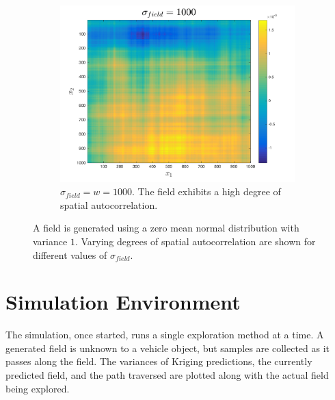 \begin{figure}[ht!]
\begin{subfigure}[t]{0.33333\textwidth}
    \end{subfigure}%
    ~ 
    \begin{subfigure}[t]{0.33333\textwidth}
        \centering
        \includegraphics[width=\linewidth]{figures/autocorr_sigma_1000.png}
		\captionsetup{skip=0.25\baselineskip,size=footnotesize}
		\caption{$\sigma_{field} = w = 1000$. The field exhibits a high degree of spatial autocorrelation.}
    \end{subfigure}
    \caption{A field is generated using a zero mean normal distribution with variance $1$. Varying degrees of spatial autocorrelation are shown for different values of $\sigma_{field}$.}
\end{figure}

\section{Simulation Environment}
The simulation, once started, runs a single exploration method at a time. A generated field is unknown to a vehicle object, but samples are collected as it passes along the field. The variances of Kriging predictions, the currently predicted field, and the path traversed are plotted along with the actual field being explored.

